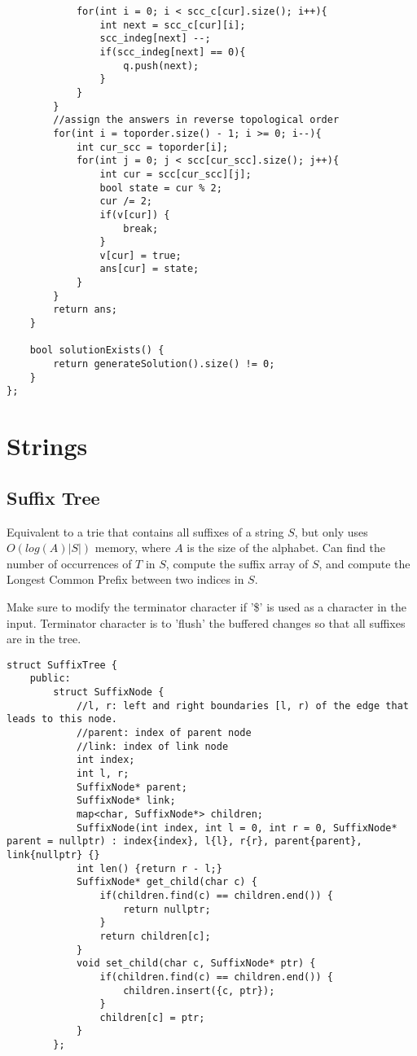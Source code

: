 \documentclass[8pt, headheight=10pt, a4paper]{article}
\begin{document}
\begin{multicols*}{3}
\begin{lstlisting}
            for(int i = 0; i < scc_c[cur].size(); i++){
                int next = scc_c[cur][i];
                scc_indeg[next] --;
                if(scc_indeg[next] == 0){
                    q.push(next);
                }
            }
        }
        //assign the answers in reverse topological order
        for(int i = toporder.size() - 1; i >= 0; i--){
            int cur_scc = toporder[i];
            for(int j = 0; j < scc[cur_scc].size(); j++){
                int cur = scc[cur_scc][j];
                bool state = cur % 2;
                cur /= 2;
                if(v[cur]) {
                    break;
                }
                v[cur] = true;
                ans[cur] = state;
            }
        }
        return ans;
    }

    bool solutionExists() {
        return generateSolution().size() != 0;
    }
};
\end{lstlisting}

\section{Strings}
\subsection{Suffix Tree}
Equivalent to a trie that contains all suffixes of a string $S$, but only uses $O(log(A)|S|)$ memory, where $A$ is the size of the alphabet. Can find the number of occurrences of $T$ in $S$, compute the suffix array of $S$, and compute the Longest Common Prefix between two indices in $S$. 

Make sure to modify the terminator character if '\$' is used as a character in the input. Terminator character is to 'flush' the buffered changes so that all suffixes are in the tree. 
\begin{lstlisting}
struct SuffixTree {
    public:
        struct SuffixNode {
            //l, r: left and right boundaries [l, r) of the edge that leads to this node.   
            //parent: index of parent node
            //link: index of link node
            int index;
            int l, r;
            SuffixNode* parent;
            SuffixNode* link;
            map<char, SuffixNode*> children;
            SuffixNode(int index, int l = 0, int r = 0, SuffixNode* parent = nullptr) : index{index}, l{l}, r{r}, parent{parent}, link{nullptr} {}
            int len() {return r - l;}
            SuffixNode* get_child(char c) {
                if(children.find(c) == children.end()) {
                    return nullptr;
                }
                return children[c];
            }
            void set_child(char c, SuffixNode* ptr) {
                if(children.find(c) == children.end()) {
                    children.insert({c, ptr});
                }
                children[c] = ptr;
            }
        };
        

\end{lstlisting}
\end{multicols*}
\end{document}
